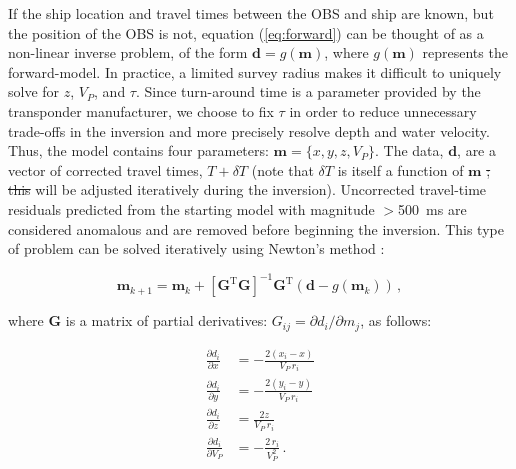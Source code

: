 \documentclass[10pt,titlepage]{article}
\providecommand{\DIFaddtex}[1]{{\protect\color{blue}\uwave{#1}}} %
\providecommand{\DIFdeltex}[1]{{\protect\color{red}\sout{#1}}}                      %
\providecommand{\DIFaddbegin}{} %
\providecommand{\DIFaddend}{} %
\providecommand{\DIFdelbegin}{} %
\providecommand{\DIFdelend}{} %
\providecommand{\DIFadd}[1]{\texorpdfstring{\DIFaddtex{#1}}{#1}} %
\providecommand{\DIFdel}[1]{\texorpdfstring{\DIFdeltex{#1}}{}} %
\begin{document}
If the ship location and travel times between the OBS and ship are known, but the position of the OBS is not, equation (\ref{eq:forward}) can be thought of as a non-linear inverse problem, of the form $ \mathbf{d} = g(\mathbf{m})$, where $g(\mathbf{m})$ represents the forward-model. In practice, a limited survey radius makes it difficult to uniquely solve for $z$, $V_P$, and $\tau$. Since turn-around time is a parameter provided by the transponder manufacturer, we choose to fix $\tau$ in order to reduce unnecessary trade-offs in the inversion and more precisely resolve depth and water velocity. Thus, the model contains four parameters: $\mathbf{m} = \{x,y,z,V_P\}$. The data, $\mathbf{d}$, are a vector of corrected travel times, $T+\delta T$ (note that $\delta T$ is itself a function of $\mathbf{m}$ \DIFdelbegin \DIFdel{; this }\DIFdelend \DIFaddbegin \DIFadd{and }\DIFaddend will be adjusted iteratively during the inversion). Uncorrected travel-time residuals predicted from the starting model with magnitude $>$500~ms are considered anomalous and are removed before beginning the inversion. This type of problem can be solved iteratively using Newton's method \citep{Menke2018}:

\begin{equation}
	\mathbf{m}_{k+1} = \mathbf{m}_k + \left[\mathbf{G}^{\text{T}} \mathbf{G}\right]^{-1} \mathbf{G}^{\text{T}} \left(\mathbf{d} - g(\mathbf{m}_k)\right) \,,
\end{equation}

where $\mathbf{G}$ is a matrix of partial derivatives: $G_{ij} = \partial d_i/\partial m_j$, as follows:

\begin{align}
\frac{\partial d_i}{\partial x} &= 
	-\frac{2 (x_i - x)}{V_P \, r_i}\\
\frac{\partial d_i}{\partial y} &= 
	-\frac{2 (y_i - y)}{V_P \, r_i} \\
\frac{\partial d_i}{\partial z} &= 
	\frac{2 z}{V_P \, r_i} \\	
\frac{\partial d_i}{\partial V_P} &= 
	-\frac{2 \, r_i}{V_P^2} \,.
\end{align}
\end{document}
